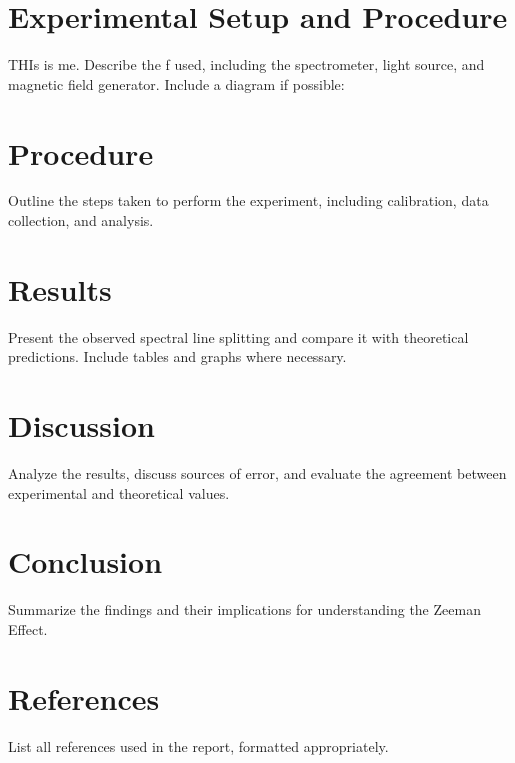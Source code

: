 \documentclass[a4paper,12pt]{article}
\begin{document}
\section{Experimental Setup and Procedure}
THIs is me.
Describe the f used, including the spectrometer, light source, and magnetic field generator. Include a diagram if possible:

\section{Procedure}
Outline the steps taken to perform the experiment, including calibration, data collection, and analysis.

\section{Results}
Present the observed spectral line splitting and compare it with theoretical predictions. Include tables and graphs where necessary.

\section{Discussion}
Analyze the results, discuss sources of error, and evaluate the agreement between experimental and theoretical values.

\section{Conclusion}
Summarize the findings and their implications for understanding the Zeeman Effect.

\section*{References}
List all references used in the report, formatted appropriately.
\end{document}
